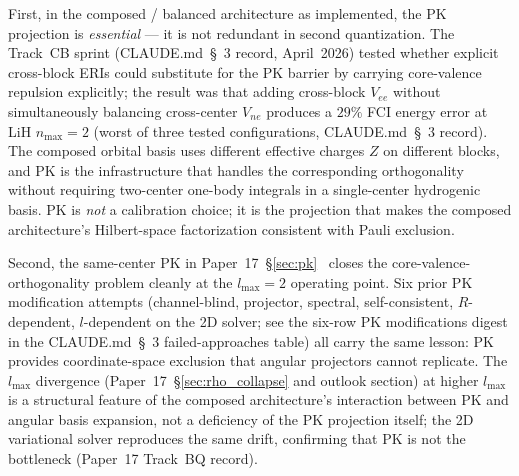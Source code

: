 First, in the composed / balanced architecture as implemented, the PK
projection is \emph{essential} --- it is not redundant in second
quantization.  The Track~CB sprint (CLAUDE.md~\S~3 record, April~2026)
tested whether explicit cross-block ERIs could substitute for the PK
barrier by carrying core-valence repulsion explicitly; the result was
that adding cross-block $V_{ee}$ without simultaneously balancing
cross-center $V_{ne}$ produces a $29\%$ FCI energy error at LiH
$n_\text{max}=2$ (worst of three tested configurations, CLAUDE.md~\S~3
record).  The composed orbital basis uses different effective charges
$Z$ on different blocks, and PK is the infrastructure that handles
the corresponding orthogonality without requiring two-center one-body
integrals in a single-center hydrogenic basis.  PK is \emph{not} a
calibration choice; it is the projection that makes the composed
architecture's Hilbert-space factorization consistent with Pauli
exclusion.

Second, the same-center PK in
Paper~17~\S\ref{sec:pk}~\cite{paper17,pk1959} closes the
core-valence-orthogonality problem cleanly at the $l_\text{max} = 2$
operating point.  Six prior PK modification attempts
(channel-blind, projector, spectral, self-consistent, $R$-dependent,
$l$-dependent on the 2D solver; see the
six-row PK modifications digest in the CLAUDE.md~\S~3
failed-approaches table) all carry the same lesson:
PK provides coordinate-space exclusion that angular projectors cannot
replicate.  The $l_\text{max}$ divergence (Paper~17~\S\ref{sec:rho_collapse}
and outlook section) at higher $l_\text{max}$ is a structural feature
of the composed architecture's interaction between PK and angular
basis expansion, not a deficiency of the PK projection itself; the
2D variational solver reproduces the same drift, confirming that PK
is not the bottleneck (Paper~17 Track~BQ record).

